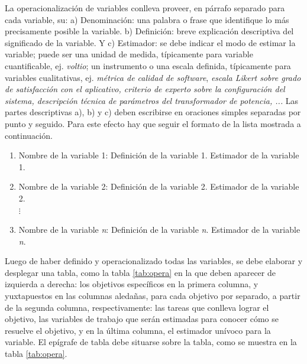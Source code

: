 \documentclass[12pt,a4paper]{article}
\begin{document}
La operacionalización de variables conlleva proveer, en párrafo separado para cada variable, su: a) Denominación: una palabra o frase que identifique lo más precisamente posible la variable. b) Definición: breve explicación descriptiva del significado de la variable. Y c) Estimador: se debe indicar el modo de estimar la variable; puede ser una unidad de medida, típicamente para variable cuantificable, ej. \textit{voltio}; un instrumento o una escala definida, típicamente para variables cualitativas, ej. \textit{métrica de calidad de software}, \textit{escala Likert sobre grado de satisfacción con el aplicativo, criterio de experto sobre la configuración del sistema, descripción técnica de parámetros del transformador de potencia, ...} Las partes descriptivas a), b) y c) deben escribirse en oraciones simples separadas por punto y seguido. Para este efecto hay que seguir el formato de la lista mostrada a continuación.

\begin{enumerate}
\item Nombre de la variable 1: Definición de la variable 1. Estimador de la variable 1.
\item Nombre de la variable 2: Definición de la variable 2. Estimador de la variable 2.\\
 $ \vdots $
\item Nombre de la variable \textit{n}: Definición de la variable \textit{n}. Estimador de la variable \textit{n}.
\end{enumerate}

Luego de haber definido y operacionalizado todas las variables, se debe elaborar y desplegar una tabla, como la tabla \ref{tab:opera} en la que deben aparecer de izquierda a derecha: los objetivos específicos en la primera columna, y yuxtapuestos en las columnas aledañas, para cada objetivo por separado, a partir de la segunda columna, respectivamente: las tareas que conlleva lograr el objetivo, las variables de trabajo que serán estimadas para conocer cómo se resuelve el objetivo, y en la última columna, el estimador unívoco para la variable. El epígrafe de tabla debe situarse sobre la tabla, como se muestra en la tabla \ref{tab:opera}.
\end{document}
